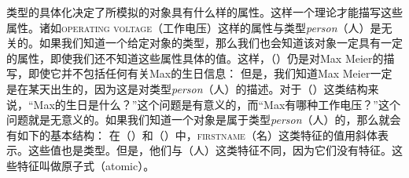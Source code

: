 类型的具体化决定了所模拟的对象具有什么样的属性。这样一个理论才能描写这些属性。诸如\textsc{operating voltage}（工作电压）这样的属性与类型\textit{person}（人）是无关的。如果我们知道一个给定对象的类型，那么我们也会知道该对象一定具有一定的属性，即使我们还不知道这些属性具体的值。这样，（）仍是对Max Meier的描写，即使它并不包括任何有关Max的生日信息：
\ea
{}
\z
但是，我们知道Max Meier一定是在某天出生的，因为这是对类型\textit{person}（人）的描述。对于（）这类结构来说，“Max的生日是什么？”这个问题是有意义的，而“Max有哪种工作电压？”这个问题就是无意义的。如果我们知道一个对象是属于类型\textit{person}（人）的，那么就会有如下的基本结构：
\ea
{}
\z
在（）和（）中，\textsc{firstname}（名）这类特征的值用斜体表示。这些值也是类型。但是，他们与（人）这类特征不同，因为它们没有特征。这些特征叫做原子式（atomic）。

